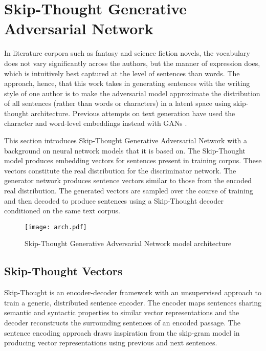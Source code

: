 \documentclass[11pt,a4paper]{article}
\begin{document}
\section{Skip-Thought Generative Adversarial Network}

 In literature corpora such as fantasy and science fiction novels, the vocabulary does not vary significantly across 
 the authors, but the manner of expression does, which is intuitively best captured at the level of sentences than words. 
 The approach, hence, that this work takes in generating sentences with the writing style of one author is to make the adversarial model approximate the distribution of all sentences (rather than words or characters) in a latent space using skip-thought architecture. Previous attempts on text generation have used the character and word-level embeddings instead with GANs \cite{raj}.
 
This section introduces Skip-Thought Generative Adversarial Network with a background on neural network 
models that it is based on. The Skip-Thought model \cite{kiros2015skip} produces embedding vectors for sentences
present in training corpus. These vectors constitute the real distribution for the discriminator network. The 
generator network produces sentence vectors similar to those from the encoded real distribution. The generated 
vectors are sampled over the course of training and then decoded to produce sentences using a Skip-Thought decoder conditioned on 
the same text corpus.



\begin{figure*}[h]
\begin{center}
\centerline{\texttt{[image: arch.pdf]}}
\caption{Skip-Thought Generative Adversarial Network model architecture}   
\label{fig:arch}
\end{center}
\vskip -0.2in
\end{figure*} 

\subsection{Skip-Thought Vectors}
Skip-Thought is an encoder-decoder framework with an 
unsupervised approach to train a generic, distributed sentence 
encoder. The encoder maps sentences sharing semantic and syntactic properties to 
similar vector representations and the decoder reconstructs the surrounding sentences 
of an encoded passage. The sentence 
encoding approach draws inspiration from the skip-gram model 
in producing vector representations using previous and next sentences.
\end{document}
